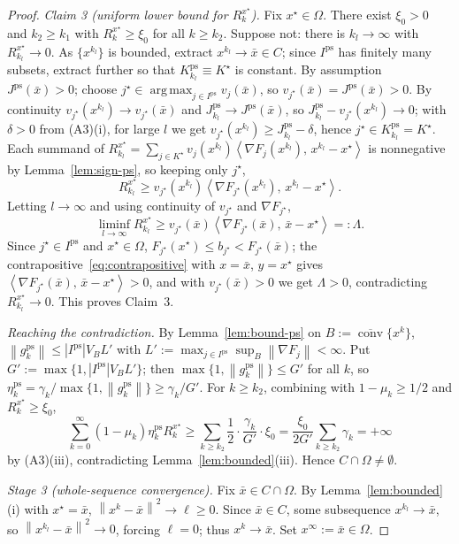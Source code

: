 \documentclass[]{interact}
\theoremstyle{plain}
\theoremstyle{definition}
\theoremstyle{remark}
\newcommand{\norm}[1]{\left\lVert #1 \right\rVert}
\newcommand{\abs}[1]{\left\lvert #1 \right\rvert}
\newcommand{\inner}[2]{\left\langle #1,\, #2 \right\rangle}
\DeclareMathOperator*{\argmax}{arg\,max}
\DeclareMathOperator{\conv}{conv}
\newcommand{\ps}{\mathrm{ps}}
\begin{document}
\begin{proof}
\smallskip
\emph{Claim 3 (uniform lower bound for $R^{x^\star}_k$).} Fix $x^\star\in\Omega$. There
exist $\xi_0>0$ and $k_2\ge k_1$ with $R^{x^\star}_k\ge\xi_0$ for all $k\ge k_2$. Suppose
not: there is $k_l\to\infty$ with $R^{x^\star}_{k_l}\to0$. As $\{x^{k_l}\}$ is bounded,
extract $x^{k_l}\to\bar x\in C$; since $I^{\ps}$ has finitely many subsets, extract
further so that $K^{\ps}_{k_l}\equiv K^\star$ is constant. By assumption
$J^{\ps}(\bar x)>0$; choose $j^\star\in\argmax_{j\in I^{\ps}}v_j(\bar x)$, so
$v_{j^\star}(\bar x)=J^{\ps}(\bar x)>0$. By continuity $v_{j^\star}(x^{k_l})\to
v_{j^\star}(\bar x)$ and $J^{\ps}_{k_l}\to J^{\ps}(\bar x)$, so
$J^{\ps}_{k_l}-v_{j^\star}(x^{k_l})\to0$; with $\delta>0$ from (A3)(i), for large $l$ we
get $v_{j^\star}(x^{k_l})\ge J^{\ps}_{k_l}-\delta$, hence $j^\star\in K^{\ps}_{k_l}=K^\star$.
Each summand of
$R^{x^\star}_{k_l}=\sum_{j\in K^\star}v_j(x^{k_l})\inner{\nabla F_j(x^{k_l})}{x^{k_l}-x^\star}$
is nonnegative by Lemma~\ref{lem:sign-ps}, so keeping only $j^\star$,
\[
R^{x^\star}_{k_l}\ge v_{j^\star}(x^{k_l})\inner{\nabla F_{j^\star}(x^{k_l})}{x^{k_l}-x^\star}.
\]
Letting $l\to\infty$ and using continuity of $v_{j^\star}$ and $\nabla F_{j^\star}$,
\[
\liminf_{l\to\infty}R^{x^\star}_{k_l}\ge v_{j^\star}(\bar x)\inner{\nabla F_{j^\star}(\bar x)}{\bar x-x^\star}=:\Lambda .
\]
Since $j^\star\in I^{\ps}$ and $x^\star\in\Omega$, $F_{j^\star}(x^\star)\le b_{j^\star}<F_{j^\star}(\bar x)$;
the contrapositive~\eqref{eq:contrapositive} with $x=\bar x$, $y=x^\star$ gives
$\inner{\nabla F_{j^\star}(\bar x)}{\bar x-x^\star}>0$, and with $v_{j^\star}(\bar x)>0$ we
get $\Lambda>0$, contradicting $R^{x^\star}_{k_l}\to0$. This proves Claim~3.

\smallskip
\emph{Reaching the contradiction.} By Lemma~\ref{lem:bound-ps} on
$B:=\overline{\conv}\{x^k\}$, $\norm{g^{\ps}_k}\le\abs{I^{\ps}}V_B L'$ with
$L':=\max_{j\in I^{\ps}}\sup_B\norm{\nabla F_j}<\infty$. Put
$G':=\max\{1,\abs{I^{\ps}}V_B L'\}$; then $\max\{1,\norm{g^{\ps}_k}\}\le G'$ for all $k$,
so $\eta^{\ps}_k=\gamma_k/\max\{1,\norm{g^{\ps}_k}\}\ge\gamma_k/G'$. For $k\ge k_2$,
combining with $1-\mu_k\ge1/2$ and $R^{x^\star}_k\ge\xi_0$,
\[
\sum_{k=0}^\infty(1-\mu_k)\eta^{\ps}_k R^{x^\star}_k\ge\sum_{k\ge k_2}\frac12\cdot\frac{\gamma_k}{G'}\cdot\xi_0=\frac{\xi_0}{2G'}\sum_{k\ge k_2}\gamma_k=+\infty
\]
by (A3)(iii), contradicting Lemma~\ref{lem:bounded}(iii). Hence $C\cap\Omega\ne\emptyset$.

\emph{Stage 3 (whole-sequence convergence).} Fix $\bar x\in C\cap\Omega$. By
Lemma~\ref{lem:bounded}(i) with $x^\star=\bar x$, $\norm{x^k-\bar x}^2\to\ell\ge0$. Since
$\bar x\in C$, some subsequence $x^{k_l}\to\bar x$, so $\norm{x^{k_l}-\bar x}^2\to0$,
forcing $\ell=0$; thus $x^k\to\bar x$. Set $x^\infty:=\bar x\in\Omega$.
\end{proof}
\end{document}
